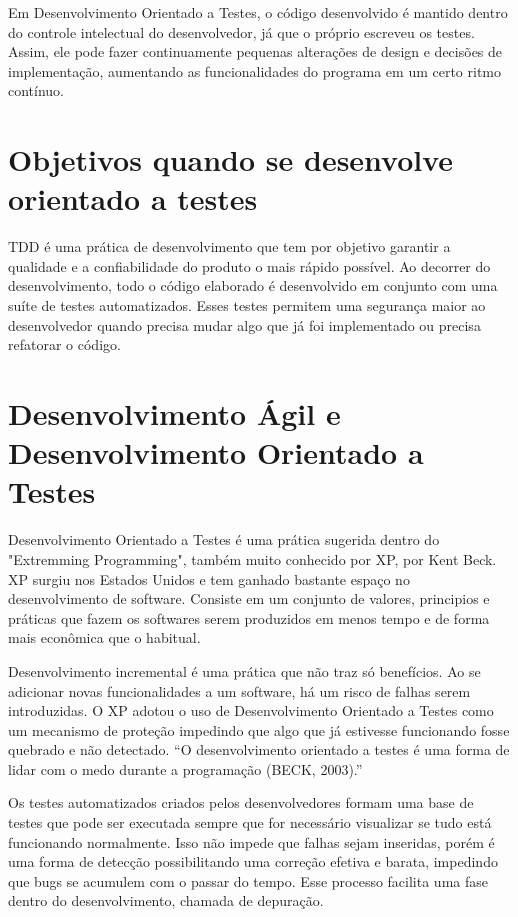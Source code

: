 \documentclass[12pt]{article}
\begin{document}
  Em Desenvolvimento Orientado a Testes, o código desenvolvido é mantido dentro do controle
  intelectual do desenvolvedor, já que o próprio escreveu os testes. Assim,
  ele pode fazer continuamente pequenas alterações de design e decisões de 
  implementação, aumentando as funcionalidades do programa em um certo ritmo 
  contínuo.

  \section{Objetivos quando se desenvolve orientado a testes}

  TDD é uma prática de desenvolvimento que tem por objetivo garantir a
  qualidade e a confiabilidade do produto o mais rápido possível. Ao decorrer do
  desenvolvimento, todo o código elaborado é desenvolvido em conjunto com uma
  suíte de testes automatizados. Esses testes permitem uma segurança maior ao
  desenvolvedor quando precisa mudar algo que já foi implementado ou precisa 
  refatorar o código.

  \section{Desenvolvimento Ágil e Desenvolvimento Orientado a Testes}

  Desenvolvimento Orientado a Testes é uma prática sugerida dentro do "Extremming 
  Programming", também muito conhecido por XP, por Kent Beck. XP surgiu nos
  Estados Unidos e tem ganhado bastante espaço no desenvolvimento de software.
  Consiste em um conjunto de valores, principios e práticas que fazem os softwares 
  serem produzidos em menos tempo e de forma mais econômica que o habitual.

  Desenvolvimento incremental é uma prática que não traz só benefícios. Ao se
  adicionar novas funcionalidades a um software, há um risco de falhas serem 
  introduzidas. O XP adotou o uso de Desenvolvimento Orientado a Testes
  como um mecanismo
  de proteção impedindo que algo que já estivesse funcionando fosse quebrado
  e não detectado. “O desenvolvimento orientado a testes é uma forma de lidar 
  com o medo durante a programação (BECK, 2003).”

  Os testes automatizados criados pelos desenvolvedores formam uma base de 
  testes que pode ser executada sempre que for necessário visualizar se tudo está
  funcionando normalmente. Isso não impede que falhas sejam inseridas, porém
  é uma forma de detecção possibilitando uma correção efetiva e barata, impedindo
  que bugs se acumulem com o passar do tempo. Esse processo facilita uma fase 
  dentro do desenvolvimento, chamada de depuração.
\end{document}
